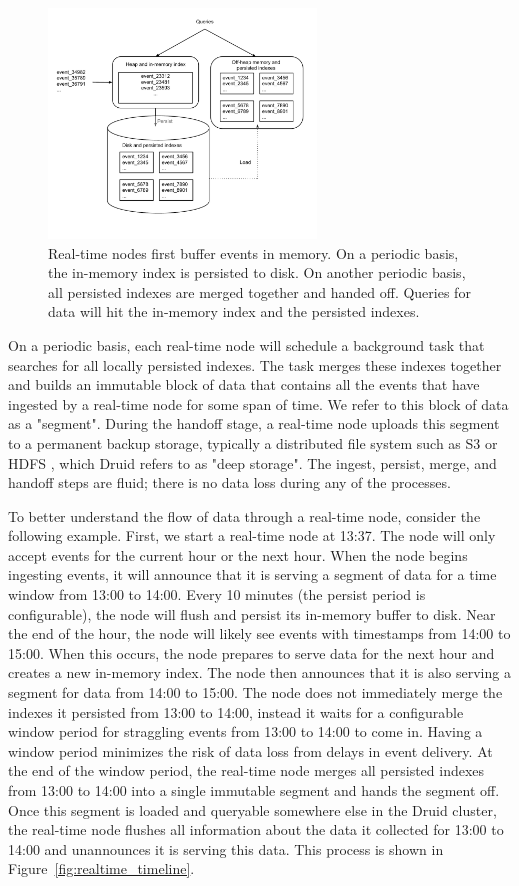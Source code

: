 \documentclass{acm_proc_article-sp}
\begin{document}
\begin{figure} 
\centering 
\includegraphics[width = 2.8in]{realtime_flow}
\caption{Real-time nodes first buffer events in memory. On a periodic basis,
the in-memory index is persisted to disk. On another periodic basis, all
persisted indexes are merged together and handed off. Queries for data will hit the
in-memory index and the persisted indexes.}
\label{fig:realtime_flow}
\end{figure}

On a periodic basis, each real-time node will schedule a background task that
searches for all locally persisted indexes. The task merges these indexes
together and builds an immutable block of data that contains all the events
that have ingested by a real-time node for some span of time. We refer to this
block of data as a "segment". During the handoff stage, a real-time node
uploads this segment to a permanent backup storage, typically a distributed
file system such as S3 \cite{decandia2007dynamo} or HDFS
\cite{shvachko2010hadoop}, which Druid refers to as "deep storage". The ingest,
persist, merge, and handoff steps are fluid; there is no data loss during any
of the processes.

To better understand the flow of data through a real-time node, consider the
following example. First, we start a real-time node at 13:37. The node will
only accept events for the current hour or the next hour. When the node begins
ingesting events, it will announce that it is serving a segment of data for a
time window from 13:00 to 14:00.  Every 10 minutes (the persist period is
configurable), the node will flush and persist its in-memory buffer to disk.
Near the end of the hour, the node will likely see events with timestamps from
14:00 to 15:00. When this occurs, the node prepares to serve data for the next
hour and creates a new in-memory index. The node then announces that it is also
serving a segment for data from 14:00 to 15:00.  The node does not immediately
merge the indexes it persisted from 13:00 to 14:00, instead it waits for a
configurable window period for straggling events from 13:00 to 14:00 to come
in. Having a window period minimizes the risk of data loss from delays in event
delivery. At the end of the window period, the real-time node merges all
persisted indexes from 13:00 to 14:00 into a single immutable segment and hands
the segment off.  Once this segment is loaded and queryable somewhere else in
the Druid cluster, the real-time node flushes all information about the data it
collected for 13:00 to 14:00 and unannounces it is serving this data. This
process is shown in Figure~\ref{fig:realtime_timeline}. 
\end{document}
